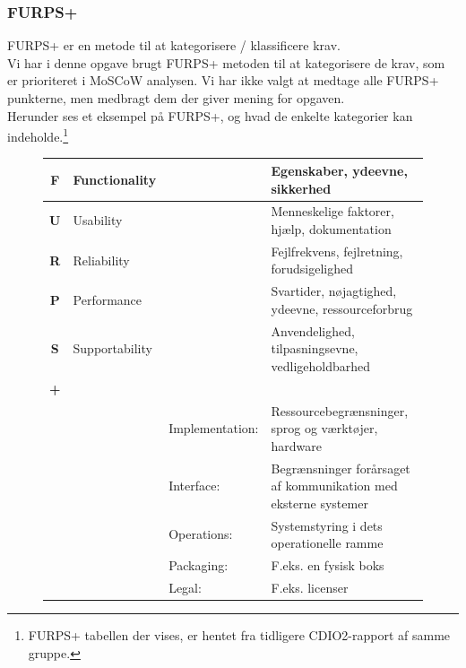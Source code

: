 \subsubsection{FURPS+}

FURPS+ er en metode til at kategorisere / klassificere krav. \\
Vi har i denne opgave brugt FURPS+ metoden til at kategorisere de krav, som er prioriteret i MoSCoW analysen.
Vi har ikke valgt at medtage alle FURPS+ punkterne, men medbragt dem der giver mening for opgaven. \\
Herunder ses et eksempel på FURPS+, og hvad de enkelte kategorier kan indeholde.\footnote{FURPS+ tabellen der vises, er hentet fra tidligere CDIO2-rapport af samme gruppe.}

\begin{figure}[ht]{
    \centering
\begin{tabular}{|c | p{} p{} |p{}|}
       \hline
       \textbf{F}   &   Functionality   &&
       Egenskaber, ydeevne, sikkerhed                   \\
       \hline

       \textbf{U}   &   Usability       &&
       Menneskelige faktorer, hjælp, dokumentation      \\
       \hline

       \textbf{R}   &   Reliability     &&
       Fejlfrekvens, fejlretning, forudsigelighed       \\
       \hline

       \textbf{P}   &   Performance     &&
       Svartider, nøjagtighed, ydeevne, ressourceforbrug                                                      \\
       \hline

       \textbf{S}   &   Supportability  &&
       Anvendelighed, tilpasningsevne, vedligeholdbarhed                                                      \\
       \hline

       \textbf{+}   &                   &&              \\

       &&   Implementation: &   Ressourcebegrænsninger, sprog og værktøjer, hardware                     \\

       &&   Interface:      &   Begrænsninger forårsaget af kommunikation med eksterne systemer              \\

       &&   Operations:     &   Systemstyring i dets operationelle ramme                              \\

       &&   Packaging:      &   F.eks. en fysisk boks   \\

       &&    Legal:         &   F.eks. licenser       \\
       \hline
\end{tabular}}
\end{figure}

